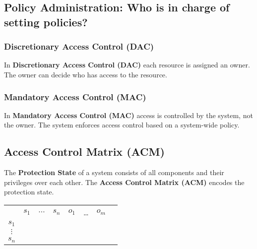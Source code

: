 \documentclass[12pt,A4]{extarticle}
\newcommand{\highlight}[1]{\textcolor{highlightColor}{\textbf{#1}}}
\begin{document}
\subsection{Policy Administration: Who is in charge of setting policies?}
\subsubsection{Discretionary Access Control (DAC)}
In \highlight{Discretionary Access Control (DAC)} each resource is assigned an owner. The owner can decide who has access to the resource.

\subsubsection{Mandatory Access Control (MAC)}
In \highlight{Mandatory Access Control (MAC)} access is controlled by the system, not the owner. The system enforces access control based on a system-wide policy.

\subsection{Access Control Matrix (ACM)}
The \textbf{Protection State} of a system consists of all components and their privileges over each other. The \highlight{Access Control Matrix (ACM)} encodes the protection state.

\begin{center}
  \begin{tabular}{c|c|c|c|c|c|c|c|}
    \multicolumn{1}{c}{} & \multicolumn{1}{c}{$s_1$} & \multicolumn{1}{c}{$\dots$} & \multicolumn{1}{c}{$s_n$} & \multicolumn{1}{c}{$o_1$} & \multicolumn{1}{c}{\dots} & \multicolumn{1}{c}{$o_m$} \\
    \cline{2-7}
    $s_1$                &                           &                             &                           &                           &                           &                           \\
    \cline{2-7}
    $\vdots$             &                           &                             &                           &                           &                           &                           \\
    \cline{2-7}
    $s_n$                &                           &                             &                           &                           &                           &                           \\
    \cline{2-7}
  \end{tabular}
\end{center}
\end{document}
